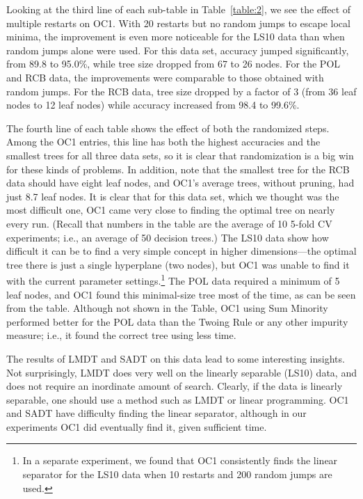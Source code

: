 Looking at the third line of each sub-table in Table~\ref{table:2}, we
see the effect of multiple restarts on OC1.  With 20 restarts but no
random jumps to escape local minima, the improvement is even more
noticeable for the LS10 data than when random jumps alone were used.
For this data set, accuracy jumped significantly, from 89.8 to 95.0\%,
while tree size dropped from 67 to 26 nodes.  For the POL and RCB
data, the improvements were comparable to those obtained with random
jumps.  For the RCB data, tree size dropped by a factor of 3 (from 36
leaf nodes to 12 leaf nodes) while accuracy increased from 98.4 to
99.6\%.

The fourth line of each table shows the effect of both the randomized
steps.  Among the OC1 entries, this line has both the highest
accuracies and the smallest trees for all three data sets, so it is
clear that randomization is a big win for these kinds of problems.  In
addition, note that the smallest tree for the RCB data should have
eight leaf nodes, and OC1's average trees, without pruning, had just
8.7 leaf nodes.  It is clear that for this data set, which we thought
was the most difficult one, OC1 came very close to finding the optimal
tree on nearly every run. (Recall that numbers in the table are the
average of 10 5-fold CV experiments; i.e., an average of 50 decision
trees.)  The LS10 data show how difficult it can be to find a very
simple concept in higher dimensions---the optimal tree there is just a
single hyperplane (two nodes), but OC1 was unable to find it with the
current parameter settings.\footnote {In a separate experiment, we
found that OC1 consistently finds the linear separator for the LS10
data when 10 restarts and 200 random jumps are used.} The POL data
required a minimum of 5 leaf nodes, and OC1 found this minimal-size
tree most of the time, as can be seen from the table.  Although not
shown in the Table, OC1 using Sum Minority performed better for the
POL data than the Twoing Rule or any other impurity measure; i.e., it
found the correct tree using less time.

The results of LMDT and SADT on this data lead to some interesting
insights.  Not surprisingly, LMDT does very well on the linearly
separable (LS10) data, and does not require an inordinate amount of
search.  Clearly, if the data is linearly separable, one should use
a method such as LMDT or linear programming.  OC1 and SADT have
difficulty finding the linear separator, although in our experiments
OC1 did eventually find it, given sufficient time.

